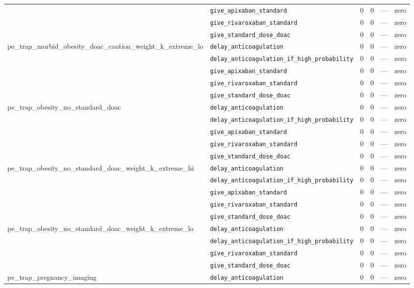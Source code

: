 \begin{table}[ht]
\begin{tabular}{llrrrl}
 & \texttt{give\_apixaban\_standard} & 0 & 0 & — & zero \\
 & \texttt{give\_rivaroxaban\_standard} & 0 & 0 & — & zero \\
 & \texttt{give\_standard\_dose\_doac} & 0 & 0 & — & zero \\
\midrule
pe\_trap\_morbid\_obesity\_doac\_caution\_weight\_k\_extreme\_lo & \texttt{delay\_anticoagulation} & 0 & 0 & — & zero \\
 & \texttt{delay\_anticoagulation\_if\_high\_probability} & 0 & 0 & — & zero \\
 & \texttt{give\_apixaban\_standard} & 0 & 0 & — & zero \\
 & \texttt{give\_rivaroxaban\_standard} & 0 & 0 & — & zero \\
 & \texttt{give\_standard\_dose\_doac} & 0 & 0 & — & zero \\
\midrule
pe\_trap\_obesity\_no\_standard\_doac & \texttt{delay\_anticoagulation} & 0 & 0 & — & zero \\
 & \texttt{delay\_anticoagulation\_if\_high\_probability} & 0 & 0 & — & zero \\
 & \texttt{give\_apixaban\_standard} & 0 & 0 & — & zero \\
 & \texttt{give\_rivaroxaban\_standard} & 0 & 0 & — & zero \\
 & \texttt{give\_standard\_dose\_doac} & 0 & 0 & — & zero \\
\midrule
pe\_trap\_obesity\_no\_standard\_doac\_weight\_k\_extreme\_hi & \texttt{delay\_anticoagulation} & 0 & 0 & — & zero \\
 & \texttt{delay\_anticoagulation\_if\_high\_probability} & 0 & 0 & — & zero \\
 & \texttt{give\_apixaban\_standard} & 0 & 0 & — & zero \\
 & \texttt{give\_rivaroxaban\_standard} & 0 & 0 & — & zero \\
 & \texttt{give\_standard\_dose\_doac} & 0 & 0 & — & zero \\
\midrule
pe\_trap\_obesity\_no\_standard\_doac\_weight\_k\_extreme\_lo & \texttt{delay\_anticoagulation} & 0 & 0 & — & zero \\
 & \texttt{delay\_anticoagulation\_if\_high\_probability} & 0 & 0 & — & zero \\
 & \texttt{give\_rivaroxaban\_standard} & 0 & 0 & — & zero \\
 & \texttt{give\_standard\_dose\_doac} & 0 & 0 & — & zero \\
\midrule
pe\_trap\_pregnancy\_imaging & \texttt{delay\_anticoagulation} & 0 & 0 & — & zero \\

\end{tabular}
\end{table}

